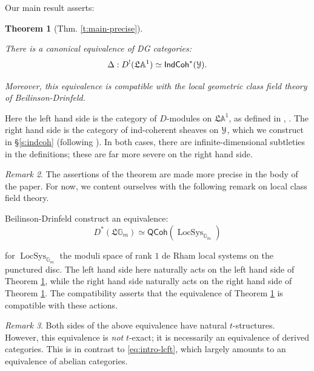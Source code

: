 \documentclass[reqno,11pt]{amsart}
\numberwithin{equation}{subsection}
\newtheorem{thm}{Theorem}[subsubsection]
\theoremstyle{remark}
\newtheorem{rem}[thm]{Remark}
\newcommand{\bA}{{\mathbb A}}
\newcommand{\bG}{{\mathbb G}}
\newcommand{\sY}{{\EuScript Y}}
\newcommand{\fL}{{\mathfrak L}}
\newcommand{\on}{\operatorname}
\newcommand{\LocSys}{\on{LocSys}}
\newcommand{\IndCoh}{\mathsf{IndCoh}}
\newcommand{\QCoh}{\mathsf{QCoh}}
\begin{document}
Our main result asserts:

\begin{thm}[Thm. \ref{t:main-precise}]\label{t:main}

There is a canonical equivalence of DG categories:
%
\[
\Delta:D^!(\fL \bA^1) \simeq \IndCoh^*(\sY).
\]

Moreover, this equivalence is compatible with the local geometric 
class field theory of Beilinson-Drinfeld. 

\end{thm}

Here the left hand side is the category of $D$-modules on $\fL \bA^1$,
as defined in \cite{dario-*/!}, \cite{dmod}. The right hand side
is the category of ind-coherent sheaves on $\sY$, which we construct
in \S \ref{s:indcoh} (following \cite{methods}). In both cases,
there are infinite-dimensional subtleties in the definitions; 
these are far more severe on the right hand side. 

\begin{rem}

The assertions of the theorem are made more precise in the body of the paper. 
For now, we content ourselves with the following remark on local class field theory.

Beilinson-Drinfeld construct an equivalence:
%
\begin{equation}\label{eq:intro-lcft}
D^*(\fL\bG_m) \simeq \QCoh(\LocSys_{\bG_m})
\end{equation}

\noindent for $\LocSys_{\bG_m}$ the moduli space of rank $1$ de Rham local systems on the
punctured disc. The left hand side here naturally acts on 
the left hand side of Theorem \ref{t:main}, while the right hand side
naturally acts on the right hand side of Theorem \ref{t:main}. The compatibility
asserts that the equivalence of Theorem \ref{t:main} is compatible with 
these actions.

\end{rem}

\begin{rem}

Both sides of the above equivalence have natural $t$-structures.
However, this equivalence is \emph{not} $t$-exact; it is necessarily
an equivalence of derived categories. This is in contrast to \eqref{eq:intro-lcft},
which largely amounts to an equivalence of abelian categories. 

\end{rem}
\end{document}
